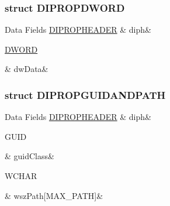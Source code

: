\subsubsection{struct D\-I\-P\-R\-O\-P\-D\-W\-O\-R\-D}
\begin{DoxyFields}{Data Fields}
\hypertarget{a00003_a7010842dfbdaa5bb4357503558202537}{\hyperlink{a00003_d0/d61/a00100}{D\-I\-P\-R\-O\-P\-H\-E\-A\-D\-E\-R}}\label{a00003_a7010842dfbdaa5bb4357503558202537}
&
diph&
\\
\hline

\hypertarget{a00003_ad38b92af7d164a277eb2d30b5e65a489}{\hyperlink{a00003_a50e15ae51c87ae06ab29c8148cb5f36c}{D\-W\-O\-R\-D}}\label{a00003_ad38b92af7d164a277eb2d30b5e65a489}
&
dw\-Data&
\\
\hline

\end{DoxyFields}
\label{da/d74/a00099}
\hypertarget{a00003_da/d74/a00099}{}
\subsubsection{struct D\-I\-P\-R\-O\-P\-G\-U\-I\-D\-A\-N\-D\-P\-A\-T\-H}
\begin{DoxyFields}{Data Fields}
\hypertarget{a00003_a7010842dfbdaa5bb4357503558202537}{\hyperlink{a00003_d0/d61/a00100}{D\-I\-P\-R\-O\-P\-H\-E\-A\-D\-E\-R}}\label{a00003_a7010842dfbdaa5bb4357503558202537}
&
diph&
\\
\hline

\hypertarget{a00003_aa494c027f8892031e449df1de44d3065}{G\-U\-I\-D}\label{a00003_aa494c027f8892031e449df1de44d3065}
&
guid\-Class&
\\
\hline

\hypertarget{a00003_a00eaadda2c946f1631087c72636d6d41}{W\-C\-H\-A\-R}\label{a00003_a00eaadda2c946f1631087c72636d6d41}
&
wsz\-Path\mbox{[}M\-A\-X\-\_\-\-P\-A\-T\-H\mbox{]}&
\\
\hline

\end{DoxyFields}
\label{d0/d61/a00100}
\hypertarget{a00003_d0/d61/a00100}{}
